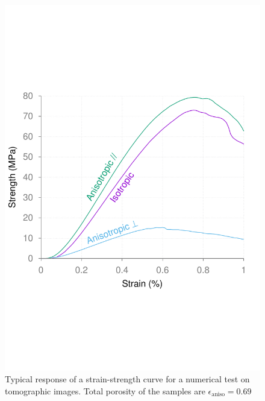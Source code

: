 \documentclass{article}
\begin{document}
	\begin{figure}[ht]
		\centering
		\includegraphics[width=\linewidth]{figures/sup_fig1}
		\caption{Typical response of a strain-strength curve for a numerical test on tomographic images. Total porosity of the samples are $\epsilon_\text{aniso} = 0.69$}
	\end{figure}
\end{document}
